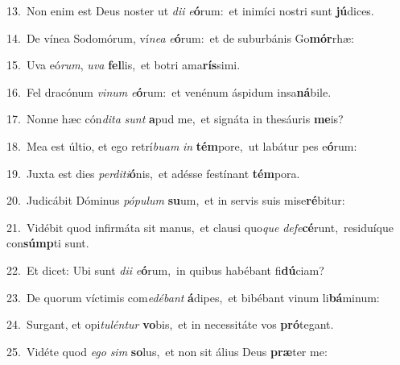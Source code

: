 {\numbfont\textcolor{\numbcolor}{13.}}~Non enim est Deus noster ut \textit{di}\-\textit{i} \textit{e}\-\textbf{ó}rum:~\star et inimíci nostri sunt \textbf{jú}\-dices.\par
{\numbfont\textcolor{\numbcolor}{14.}}~De vínea Sodomórum, ví\-\textit{ne}\-\textit{a} \textit{e}\-\textbf{ó}rum:~\star et de suburbánis Go\-\textbf{mór}\-rhæ:\par
{\numbfont\textcolor{\numbcolor}{15.}}~Uva eó\-\textit{rum}\-, \textit{u}\-\textit{va} \textbf{fel}\-lis,~\star et botri ama\-\textbf{rís}\-simi.\par
{\numbfont\textcolor{\numbcolor}{16.}}~Fel dracónum \textit{vi}\-\textit{num} \textit{e}\-\textbf{ó}rum:~\star et venénum áspidum insa\-\textbf{ná}\-bile.\par
{\numbfont\textcolor{\numbcolor}{17.}}~Nonne hæc cón\-\textit{di}\-\textit{ta} \textit{sunt} \textbf{a}\-pud me,~\star et signáta in thesáuris \textbf{me}\-is?\par
{\numbfont\textcolor{\numbcolor}{18.}}~Mea est últio, et ego retrí\-\textit{bu}\-\textit{am} \textit{in} \textbf{tém}\-pore,~\star ut labátur pes e\-\textbf{ó}\-rum:\par
{\numbfont\textcolor{\numbcolor}{19.}}~Juxta est dies \textit{per}\-\textit{di}\textit{ti}\textbf{ó}nis,~\star et adésse festínant \textbf{tém}\-pora.\par
{\numbfont\textcolor{\numbcolor}{20.}}~Judicábit Dóminus \textit{pó}\-\textit{pu}\textit{lum} \textbf{su}\-um,~\star et in servis suis mise\-\textbf{ré}\-bitur:\par
{\numbfont\textcolor{\numbcolor}{21.}}~Vidébit quod infirmáta sit manus,~\dagger et clausi quo\textit{que} \textit{de}\-\textit{fe}\textbf{cé}runt,~\star residuíque con\-\textbf{súmp}\-ti sunt.\par
{\numbfont\textcolor{\numbcolor}{22.}}~Et dicet: Ubi sunt \textit{di}\-\textit{i} \textit{e}\-\textbf{ó}rum,~\star in quibus habébant fi\-\textbf{dú}\-ciam?\par
{\numbfont\textcolor{\numbcolor}{23.}}~De quorum víctimis com\-\textit{e}\-\textit{dé}\textit{bant} \textbf{á}\-dipes,~\star et bibébant vinum li\-\textbf{bá}\-minum:\par
{\numbfont\textcolor{\numbcolor}{24.}}~Surgant, et opi\-\textit{tu}\-\textit{lén}\textit{tur} \textbf{vo}\-bis,~\star et in necessitáte vos \textbf{pró}\-tegant.\par
{\numbfont\textcolor{\numbcolor}{25.}}~Vidéte quod \textit{e}\-\textit{go} \textit{sim} \textbf{so}\-lus,~\star et non sit álius Deus \textbf{præ}\-ter me:\par
